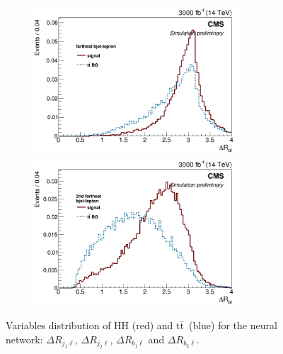 \documentclass[10pt,a4paper]{article}
\newcommand{\ww}{7.7cm} %
\newcommand{\dd}{-2mm} %
\renewcommand{\tt}{$\text{t}\bar{\text{t}}$}
\begin{document}
\begin{figure}[h]
  \begin{subfigure}[b]{17cm}
    \begin{minipage}[h!]{\ww}
      \centering
      \includegraphics[width=\ww]{figs/DeltaR_b1l.png}
    \end{minipage}
    \begin{minipage}[h!]{\ww}
      \centering
      \includegraphics[width=\ww]{figs/DeltaR_b2l.png}
    \end{minipage}
    \hspace{9mm}
  \end{subfigure}	
  \vspace{\dd}
  \caption{Variables distribution of HH (red) and \tt\ (blue) for the neural network: $\Delta R_{j_1\ell}$, $\Delta R_{j_2\ell}$, $\Delta R_{b_1\ell}$ and $\Delta R_{b_2\ell}$.} \label{vars5} %

\end{figure}
\end{document}
